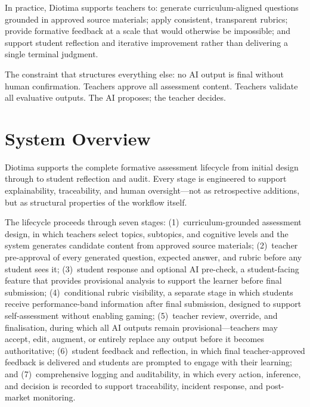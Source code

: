 \documentclass[10pt, a4paper, twocolumn]{article}
\begin{document}
In practice, Diotima supports teachers to: generate curriculum-aligned questions
grounded in approved source materials; apply consistent, transparent rubrics; provide
formative feedback at a scale that would otherwise be impossible; and support student
reflection and iterative improvement rather than delivering a single terminal judgment.

The constraint that structures everything else: no AI output is final without human
confirmation. Teachers approve all assessment content. Teachers validate all evaluative
outputs. The AI proposes; the teacher decides.

\section{System Overview}

Diotima supports the complete formative assessment lifecycle from initial design through
to student reflection and audit. Every stage is engineered to support explainability,
traceability, and human oversight---not as retrospective additions, but as structural
properties of the workflow itself.

The lifecycle proceeds through seven stages: (1)~curriculum-grounded assessment design,
in which teachers select topics, subtopics, and cognitive levels
and the system generates candidate content from approved
source materials; (2)~teacher pre-approval of every generated question, expected answer,
and rubric before any student sees it; (3)~student response and optional AI pre-check, a student-facing feature
that provides provisional analysis to support the learner before final submission; (4)~conditional rubric
visibility, a separate stage in which students receive performance-band information
after final submission, designed to support self-assessment without enabling gaming; (5)~teacher review,
override, and finalisation, during which all AI outputs remain provisional---teachers
may accept, edit, augment, or entirely replace any output before it becomes
authoritative; (6)~student feedback and reflection, in which final
teacher-approved feedback is delivered and students are prompted to engage with their
learning; and (7)~comprehensive logging and auditability, in which every action,
inference, and decision is recorded to support traceability, incident response, and
post-market monitoring.
\end{document}
